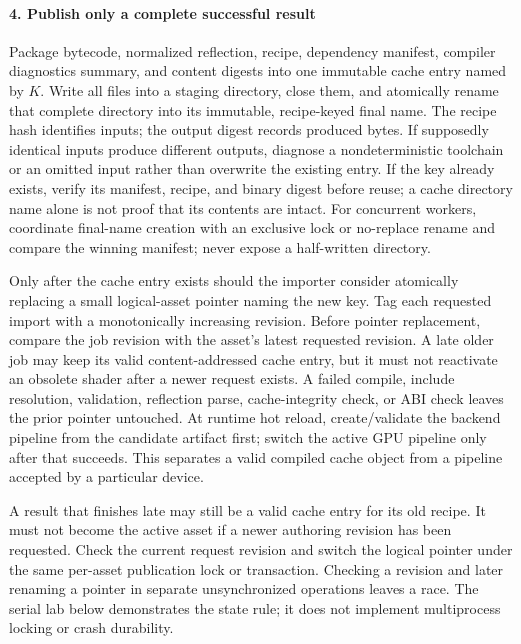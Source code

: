 \paragraph{4. Publish only a complete successful result}\label{publish-only-a-complete-successful-result}

Package bytecode, normalized reflection, recipe, dependency manifest, compiler diagnostics summary, and content digests into one immutable cache entry named by \(K\). Write all files into a staging directory, close them, and atomically rename that complete directory into its immutable, recipe-keyed final name. The recipe hash identifies inputs; the output digest records produced bytes. If supposedly identical inputs produce different outputs, diagnose a nondeterministic toolchain or an omitted input rather than overwrite the existing entry. If the key already exists, verify its manifest, recipe, and binary digest before reuse; a cache directory name alone is not proof that its contents are intact. For concurrent workers, coordinate final-name creation with an exclusive lock or no-replace rename and compare the winning manifest; never expose a half-written directory.

Only after the cache entry exists should the importer consider atomically replacing a small logical-asset pointer naming the new key. Tag each requested import with a monotonically increasing revision. Before pointer replacement, compare the job revision with the asset's latest requested revision. A late older job may keep its valid content-addressed cache entry, but it must not reactivate an obsolete shader after a newer request exists. A failed compile, include resolution, validation, reflection parse, cache-integrity check, or ABI check leaves the prior pointer untouched. At runtime hot reload, create/validate the backend pipeline from the candidate artifact first; switch the active GPU pipeline only after that succeeds. This separates a valid compiled cache object from a pipeline accepted by a particular device.

A result that finishes late may still be a valid cache entry for its old recipe. It must not become the active asset if a newer authoring revision has been requested. Check the current request revision and switch the logical pointer under the same per-asset publication lock or transaction. Checking a revision and later renaming a pointer in separate unsynchronized operations leaves a race. The serial lab below demonstrates the state rule; it does not implement multiprocess locking or crash durability.

